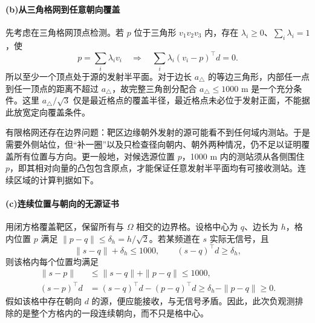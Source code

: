 \paragraph{\textbf{(b)}\hspace{0.2em}从三角格网到任意朝向覆盖}
先考虑在三角格网顶点检测。若 $p$ 位于三角形 $v_1v_2v_3$ 内，存在 $\lambda_i\ge0$、$\sum_i\lambda_i=1$，使
\begin{equation}\label{eq:q4-triangle}
 p=\sum_i\lambda_i v_i
 \quad\Longrightarrow\quad
 \sum_i\lambda_i(v_i-p)^\top d=0.
\end{equation}
所以至少一个顶点处于源的发射半平面。对于边长 $a_{\triangle}$ 的等边三角形，内部任一点到任一顶点的距离不超过 $a_{\triangle}$，故完整三角剖分配合 $a_{\triangle}\le1000$ m 是一个充分条件。这里 $a_{\triangle}/\sqrt3$ 仅是最近格点的覆盖半径，最近格点未必位于发射正面，不能据此放宽定向覆盖条件。

有限格网还存在边界问题：靶区边缘朝外发射的源可能看不到任何域内测站。于是需要外侧站位，但“补一圈”以及只检查径向朝内、朝外两种情况，仍不足以证明覆盖所有位置与方向。更一般地，对候选源位置 $p$，1000 m 内的测站须从各侧围住 $p$，即其相对向量的凸包包含原点，才能保证任意发射半平面均有可接收测站。连续区域的计算判据如下。

\paragraph{\textbf{(c)}\hspace{0.2em}连续位置与朝向的无源证书}
用闭方格覆盖靶区，保留所有与 $\Omega$ 相交的边界格。设格中心为 $q$、边长为 $h$，格内位置 $p$ 满足 $\|p-q\|\le\delta_h=h/\sqrt2$。若某频道在 $s$ 实际无信号，且
\begin{equation}\label{eq:q4-cell}
 \|s-q\|+\delta_h\le1000,\qquad (s-q)^\top d\ge\delta_h,
\end{equation}
则该格内每个位置均满足
\begin{equation}\label{eq:q4-cell-proof}
 \begin{aligned}
 \|s-p\|&\le\|s-q\|+\|p-q\|\le1000,\\
 (s-p)^\top d&=(s-q)^\top d-(p-q)^\top d\ge\delta_h-\|p-q\|\ge0.
 \end{aligned}
\end{equation}
假如该格中存在朝向 $d$ 的源，便应能接收，与无信号矛盾。因此，此次负观测排除的是整个方格内的一段连续朝向，而不只是格中心。

